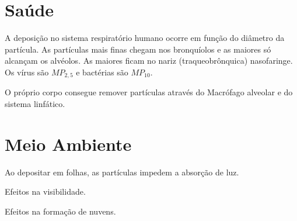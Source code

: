 \section{Saúde}

A deposição no sistema respiratório humano ocorre em função do diâmetro da partícula.
As partículas mais finas chegam nos bronquíolos e as maiores só alcançam os alvéolos.
As maiores ficam no nariz (traqueobrônquica) nasofaringe. 
Os vírus são $MP_{2,5}$ e bactérias são $MP_{10}$. 

O próprio corpo consegue remover partículas através do Macrófago alveolar 
e do sistema linfático. 

\section{Meio Ambiente}
Ao depositar em folhas, as partículas impedem a absorção de luz. 

Efeitos na visibilidade.

Efeitos na formação de nuvens.


